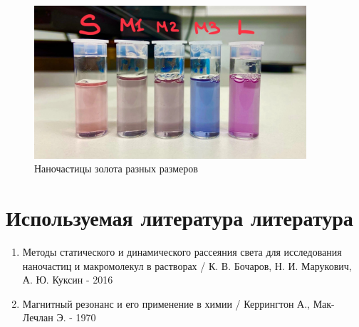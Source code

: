 \documentclass[a4paper,12pt]{article} %
\begin{document}
\begin{figure}[h!]
    \includegraphics[width=0.9\textwidth]{7hGiKI_CvME.jpg}
    \caption{Наночастицы золота разных размеров}
\end{figure}

\section{Используемая литература литература}
\begin{enumerate}
    \item Методы статического и динамического рассеяния света для исследования наночастиц и макромолекул в растворах / К. В. Бочаров, Н. И. Марукович, А. Ю. Куксин - 2016
    \item Магнитный резонанс и его применение в химии / Керрингтон А., Мак-Лечлан Э. - 1970

\end{enumerate}
\end{document}

